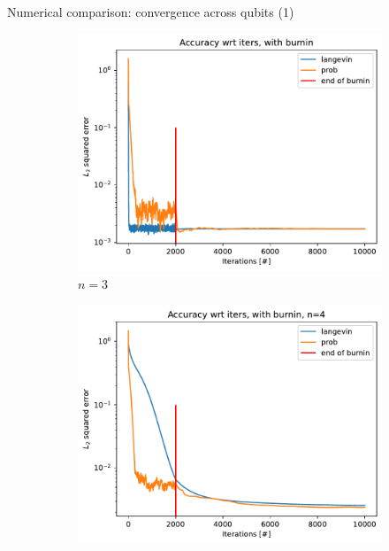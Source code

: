 \documentclass{beamer}
\begin{document}
\begin{frame}{Numerical comparison: convergence across qubits (1)}
    
    \begin{figure}[H]

        \centering
    
        \begin{subfigure}[b]{0.4\textwidth}
    
    
            \centering
    
            \includegraphics[width=\textwidth]{figures/experiments/baseline/diff_n_qubits/iters_acc_comp_iters_no_avg-1.png}
    
            \caption{$n=3$}
        
        \end{subfigure}
        \hfill
        \begin{subfigure}[b]{0.4\textwidth}
    
    
            \centering
    
            \includegraphics[width=\textwidth]{figures/experiments/baseline/diff_n_qubits/iters_acc_comp_iters_no_avg_n4-1.png}
    

\end{subfigure}
\end{figure}
\end{frame}
\end{document}
